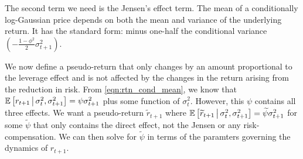 \documentclass[11pt, letterpaper, twoside]{article}
\begin{document}
The second term we need is the Jensen's effect term. The mean of a conditionally log-Gaussian price depends on both the mean and variance of the underlying return. It has the standard form: minus one-half the conditional variance $\left(-\frac{1 - \phi^2}{2} \sigma^2_{t+1}\right)$. 

We now define a pseudo-return that only changes by an amount proportional to the leverage effect and is not affected by the changes in the return arising from the reduction in risk. From \cref{eqn:rtn_cond_mean}, we know that $\operatorname{\mathbb{E}}\left[r_{t+1} \,\middle\vert\, \sigma^2_t, \sigma^2_{t+1} \right] = \psi \sigma^2_{t+1}$ plus some function of $\sigma^2_t$. However, this $\psi$ contains all three effects. We want a pseudo-return $\widetilde{r}_{t+1}$ where $\operatorname{\mathbb{E}}\left[\widetilde{r}_{t+1} \,\middle\vert\, \sigma^2_t, \sigma^2_{t+1} \right] = \widetilde{\psi} \sigma^2_{t+1}$ for some $\widetilde{\psi}$ that only contains the direct effect, not the Jensen or any risk-compensation. We can then solve for $\widetilde{\psi}$ in terms of the paramters governing the dynamics of $r_{t+1}$.
\end{document}
